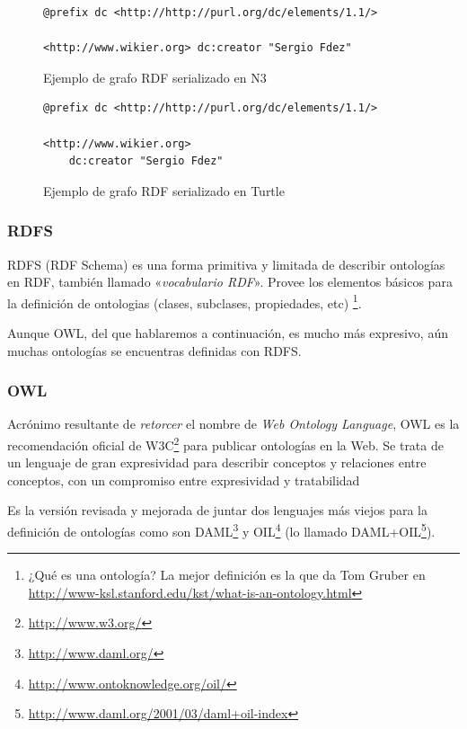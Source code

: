 \begin{figure}[H]
\lstset{language=N3}
\begin{lstlisting}
@prefix dc <http://http://purl.org/dc/elements/1.1/>

<http://www.wikier.org> dc:creator "Sergio Fdez"
\end{lstlisting}
\caption{Ejemplo de grafo RDF serializado en N3}
\label{fig:ejemplo.rdfn3}
\end{figure}

\begin{figure}[H]
\lstset{language=Turtle}
\begin{lstlisting}
@prefix dc <http://http://purl.org/dc/elements/1.1/>

<http://www.wikier.org> 
	dc:creator "Sergio Fdez"
\end{lstlisting}
\caption{Ejemplo de grafo RDF serializado en Turtle}
\label{fig:ejemplo.rdfturtle}
\end{figure}

\subsubsection{RDFS}

RDFS (RDF Schema\cite{RDFS}) es una forma primitiva y limitada de describir 
ontologías en RDF, también llamado «\emph{vocabulario RDF}». Provee los elementos
básicos para la definición de ontologias (clases, subclases, propiedades, etc)
\footnote{¿Qué es una ontología? La mejor definición es la que da Tom Gruber
en \url{http://www-ksl.stanford.edu/kst/what-is-an-ontology.html}}.

Aunque OWL, del que hablaremos a continuación, es mucho más expresivo, aún muchas
ontologías se encuentras definidas con RDFS.

\subsubsection{OWL}

Acrónimo resultante de \emph{retorcer} el nombre de 
\emph{Web Ontology Language}, OWL\cite{OWL} es la recomendación 
oficial de W3C\footnote{\url{http://www.w3.org/}} para publicar ontologías en 
la Web. Se trata de un lenguaje de gran expresividad para describir conceptos 
y relaciones entre conceptos, con un compromiso entre expresividad y tratabilidad

Es la versión revisada y mejorada de juntar dos lenguajes más viejos para la 
definición de ontologías como son DAML\footnote{\url{http://www.daml.org/}} y 
OIL\footnote{\url{http://www.ontoknowledge.org/oil/}} (lo llamado
DAML+OIL\footnote{\url{http://www.daml.org/2001/03/daml+oil-index}}).

